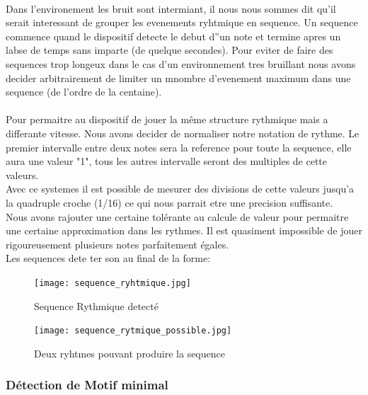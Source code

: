 \documentclass[a4paper, titlepage, oneside, 12pt]{article}%
\begin{document}
\paragraph{}
Dans l'environement les bruit sont intermiant, il nous nous sommes dit qu'il serait interessant de grouper les evenements ryhtmique en sequence. Un sequence commence quand le dispositif detecte le debut d''un note et termine apres un labse de temps sans imparte (de quelque secondes). Pour eviter de faire des sequences trop longeux dans le cas d'un environnement tres bruillant nous avons decider arbitrairement de limiter un mnombre d'evenement maximum dans une sequence (de l'ordre de la centaine).

\paragraph{}
Pour permaitre au dispositif de jouer la même structure rythmique mais a differante vitesse. Nous avons decider de normaliser notre notation de rythme.
Le premier intervalle entre deux notes sera la reference pour toute la sequence, elle aura une valeur "1", tous les autres intervalle seront des multiples de cette valeurs.\\
Avec ce systemes il est possible de mesurer des divisions de cette valeurs jusqu'a la quadruple croche (1/16) ce qui nous parrait etre une precision suffisante.\\
Nous avons rajouter une certaine tolérante au calcule de valeur pour permaitre une certaine approximation dans les rythmes. Il est quasiment impossible de jouer rigoureusement plusieurs notes parfaitement égales.\\
Les sequences dete ter son au final de la forme:\\
\begin{figure}[H]
	\texttt{[image: sequence\_ryhtmique.jpg]}
	\caption{\label{étiquette} Sequence Rythmique detecté}
	\texttt{[image: sequence\_rytmique\_possible.jpg]}
	\caption{\label{étiquette} Deux ryhtmes pouvant produire la sequence}
\end{figure}

\subsubsection{Détection de Motif minimal}
\end{document}
